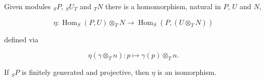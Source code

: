 Given modules ${}_S P$, ${}_S U_T$ and ${}_T N$ there is a homomorphism, natural in $P$, $U$ and $N$,

$$\eta: \operatorname{Hom}_S(P, U) \otimes_T N \to \operatorname{Hom}_S(P, (U \otimes_T N))$$

defined via

$$\eta(\gamma \otimes_T n): p \mapsto \gamma(p) \otimes_T n.$$

If ${}_S P$ is finitely generated and projective, then $\eta$ is an isomorphism.
